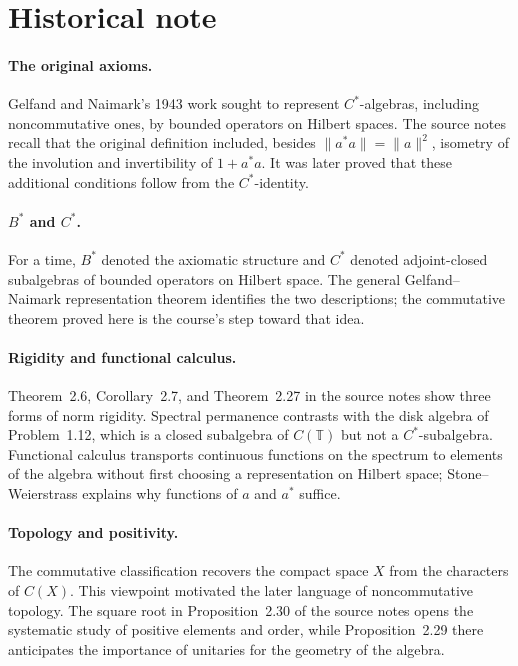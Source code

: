 \section*{Historical note}

\paragraph{The original axioms.}
Gelfand and Naimark's 1943 work sought to represent $C^*$-algebras,
including noncommutative ones, by bounded operators on Hilbert spaces.
The source notes recall that the original definition included, besides
$\|a^*a\|=\|a\|^2$, isometry of the involution and invertibility of
$1+a^*a$. It was later proved that these additional conditions follow from
the $C^*$-identity.

\paragraph{$B^*$ and $C^*$.}
For a time, $B^*$ denoted the axiomatic structure and $C^*$ denoted
adjoint-closed subalgebras of bounded operators on Hilbert space. The
general Gelfand--Naimark representation theorem identifies the two
descriptions; the commutative theorem proved here is the course's step
toward that idea.

\paragraph{Rigidity and functional calculus.}
Theorem~2.6, Corollary~2.7, and Theorem~2.27 in the source notes show three
forms of norm rigidity. Spectral permanence contrasts with the disk algebra
of Problem~1.12, which is a closed subalgebra of $C(\mathbb T)$ but not a
$C^*$-subalgebra. Functional calculus transports continuous functions on
the spectrum to elements of the algebra without first choosing a
representation on Hilbert space; Stone--Weierstrass explains why functions
of $a$ and $a^*$ suffice.

\paragraph{Topology and positivity.}
The commutative classification recovers the compact space $X$ from the
characters of $C(X)$. This viewpoint motivated the later language of
noncommutative topology. The square root in Proposition~2.30 of the source
notes opens the systematic study of positive elements and order, while
Proposition~2.29 there anticipates the importance of unitaries for the
geometry of the algebra.
